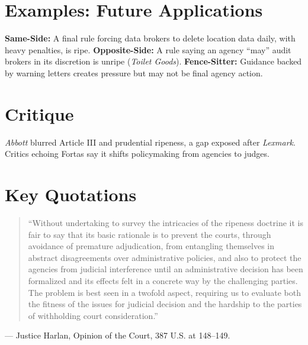 \documentclass[12pt]{article}
\begin{document}
\section{Examples: Future Applications}
\textbf{Same-Side:} A final rule forcing data brokers to delete location data daily, with heavy penalties, is ripe. \textbf{Opposite-Side:} A rule saying an agency ``may'' audit brokers in its discretion is unripe (\textit{Toilet Goods}). \textbf{Fence-Sitter:} Guidance backed by warning letters creates pressure but may not be final agency action.

\section{Critique}
\textit{Abbott} blurred Article III and prudential ripeness, a gap exposed after \textit{Lexmark}. Critics echoing Fortas say it shifts policymaking from agencies to judges.

\section{Key Quotations}
\begin{quote}
``Without undertaking to survey the intricacies of the ripeness doctrine it is fair to say that its basic rationale is to prevent the courts, through avoidance of premature adjudication, from entangling themselves in abstract disagreements over administrative policies, and also to protect the agencies from judicial interference until an administrative decision has been formalized and its effects felt in a concrete way by the challenging parties. The problem is best seen in a twofold aspect, requiring us to evaluate both the fitness of the issues for judicial decision and the hardship to the parties of withholding court consideration.''
\end{quote}
\noindent --- Justice Harlan, Opinion of the Court, 387 U.S. at 148--149.
\end{document}

